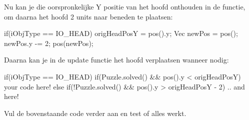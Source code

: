 Nu kan je die oorspronkelijke Y positie van het hoofd onthouden in de  functie, om daarna het hoofd 2 units naar beneden te plaatsen:

\begin{code}
if(iObjType == IO_HEAD)
{
  origHeadPosY = pos().y;
  Vec newPos = pos();
  newPos.y -= 2;
  pos(newPos);
}
\end{code}

Daarna kan je in de update functie het hoofd verplaatsen wanneer nodig:

\begin{code}
if(iObjType == IO_HEAD)
{
  if(Puzzle.solved() && pos().y < origHeadPosY)
  {
     your code here!
  }
  else if(!Puzzle.solved() && pos().y > origHeadPosY - 2)
  {
	 .. and here!
  }
}
\end{code}

\begin{exercise}
Vul de bovenstaande code verder aan en test of alles werkt.
\end{exercise}
